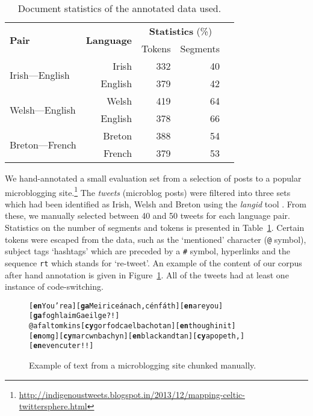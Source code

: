 \documentclass[11pt]{article}
\begin{document}
\begin{table}
\begin{center}
\begin{tabular}{|l|r|r|r|r}
\hline
\multirow{2}{*}{\textbf{Pair}} & \multirow{2}{*}{\textbf{Language}}  & \multicolumn{2}{c|}{\textbf{Statistics} (\%)} \\\cline{3-4}
                &  &  Tokens & Segments \\
\hline
\multirow{2}{*}{Irish---English} & Irish & 332 & 40 \\
                                 & English & 379 & 42 \\
\hline
\multirow{2}{*}{Welsh---English} & Welsh & 419 & 64 \\
                                 & English & 378 & 66  \\
\hline
\multirow{2}{*}{Breton---French} & Breton & 388 & 54 \\
                                 & French & 379 & 53  \\
\hline
\end{tabular}
\end{center}
\caption{Document statistics of the annotated data used. }
\label{table:datastats}
\end{table}

We hand-annotated a small evaluation set from a selection of posts to a popular microblogging site.\footnote{\url{http://indigenoustweets.blogspot.in/2013/12/mapping-celtic-twittersphere.html}} The \emph{tweets} (microblog posts) were filtered into three sets which had been identified as Irish, Welsh and Breton using the \emph{langid} tool \cite{lui2012langid}. From these, we manually selected between 40 and 50 tweets for each language pair. Statistics on the number of segments and tokens is presented in Table~\ref{table:datastats}.
Certain tokens were escaped from the data, such as the `mentioned' character (\texttt{@} symbol), subject tags `hashtags' which are preceded by a \texttt{\#} symbol, hyperlinks and the sequence \texttt{rt} which stands for `re-tweet'. An example of the content of our corpus after hand annotation is given in Figure~\ref{fig:tweets}. All of the tweets had at least one instance of code-switching.

\begin{figure}
\begin{small}
\begin{alltt}
[\textbf{en} You're a] [\textbf{ga} Meirice\'{a}nach, c\'{e}n f\'{a}th] [\textbf{en} are you] [\textbf{ga} foghlaim Gaeilge?!] 
@afaltomkins [\textbf{cy} gorfod cael bach o tan] [\textbf{en} though init] 
[\textbf{en} omg] [\textbf{cy} mar cwn bach yn] [\textbf{en} black and tan] [\textbf{cy} a popeth,] [\textbf{en} even cuter!!] 
\end{alltt}
\end{small}
\caption{Example of text from a microblogging site chunked manually.}
\label{fig:tweets}
\end{figure}
\end{document}
